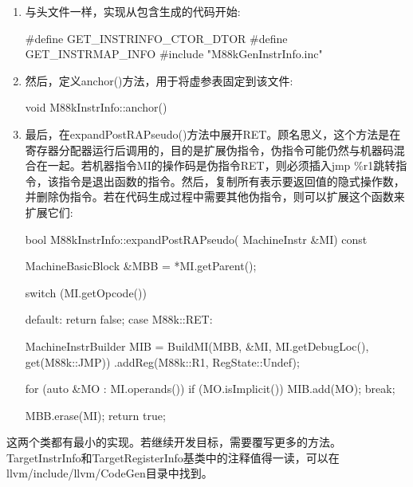 \begin{enumerate}
\item
与头文件一样，实现从包含生成的代码开始:

\begin{cpp}
#define GET_INSTRINFO_CTOR_DTOR
#define GET_INSTRMAP_INFO
#include "M88kGenInstrInfo.inc"
\end{cpp}

\item
然后，定义anchor()方法，用于将虚参表固定到该文件:

\begin{cpp}
void M88kInstrInfo::anchor() {}
\end{cpp}

\item
最后，在expandPostRAPseudo()方法中展开RET。顾名思义，这个方法是在寄存器分配器运行后调用的，目的是扩展伪指令，伪指令可能仍然与机器码混合在一起。若机器指令MI的操作码是伪指令RET，则必须插入jmp \%r1跳转指令，该指令是退出函数的指令。然后，复制所有表示要返回值的隐式操作数，并删除伪指令。若在代码生成过程中需要其他伪指令，则可以扩展这个函数来扩展它们:

\begin{cpp}
bool M88kInstrInfo::expandPostRAPseudo(
        MachineInstr &MI) const {
    MachineBasicBlock &MBB = *MI.getParent();

    switch (MI.getOpcode()) {
        default:
            return false;
        case M88k::RET: {
            MachineInstrBuilder MIB =
            BuildMI(MBB, &MI, MI.getDebugLoc(),
                    get(M88k::JMP))
                .addReg(M88k::R1, RegState::Undef);

            for (auto &MO : MI.operands()) {
                if (MO.isImplicit())
                    MIB.add(MO);
            }
            break;
    }
    }
    MBB.erase(MI);
    return true;
}
\end{cpp}

\end{enumerate}

这两个类都有最小的实现。若继续开发目标，需要覆写更多的方法。TargetInstrInfo和TargetRegisterInfo基类中的注释值得一读，可以在llvm/include/llvm/CodeGen目录中找到。


